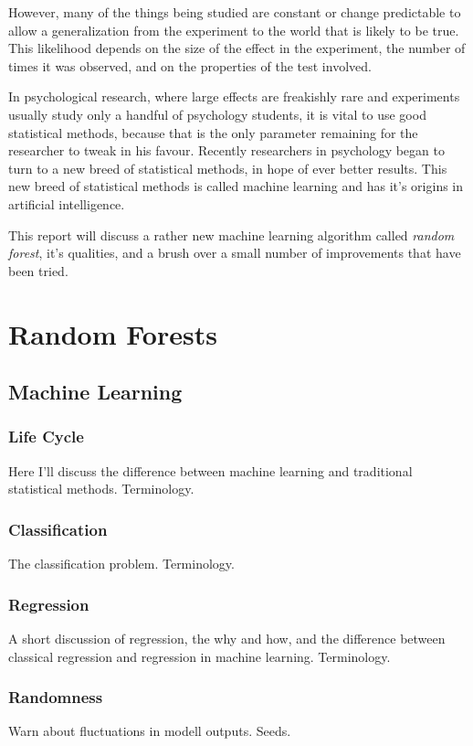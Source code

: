 \documentclass[a4paper,man,12pt,apacite]{apa6} %
\begin{document}
However, many of the things being studied are constant or change
predictable to allow a generalization from the experiment to the world
that is likely to be true. This likelihood depends on the size of the
effect in the experiment, the number of times it was observed, and on
the properties of the test involved.

In psychological research, where large effects are freakishly rare and
experiments usually study only a handful of psychology students, it is
vital to use good statistical methods, because that is the only parameter
remaining for the researcher to tweak in his favour.
Recently researchers in psychology began to turn to a new breed of
statistical methods, in hope of ever better results. This new breed of
statistical methods is called machine learning and has it's origins in
artificial intelligence.

This report will discuss a rather new machine learning algorithm called
\emph{random forest}, it's qualities, and a brush over a small number of
improvements that have been tried.

\section{Random Forests}

\subsection{Machine Learning}

\subsubsection{Life Cycle}
Here I'll discuss the difference between machine learning and traditional
statistical methods. Terminology.

\subsubsection{Classification}
The classification problem. Terminology.

\subsubsection{Regression}
A short discussion of regression, the why and how, and the difference
between classical regression and regression in machine learning.
Terminology.

\subsubsection{Randomness}
Warn about fluctuations in modell outputs. Seeds.
\end{document}
